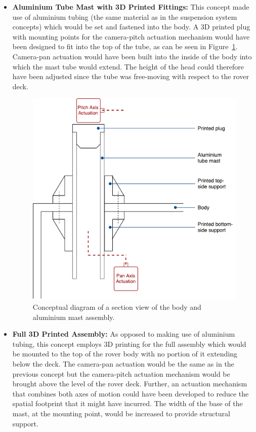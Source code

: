       \begin{itemize}
        \item \textbf{Aluminium Tube Mast with 3D Printed Fittings:} This concept made use of aluminium tubing (the same material as in the suspension system concepts) which would be set and fastened into the body. A 3D printed plug with mounting points for the camera-pitch actuation mechanism would have been designed to fit into the top of the tube, as can be seen in Figure~\ref{fig:concepts-aluMast}. Camera-pan actuation would have been built into the inside of the body into which the mast tube would extend. The height of the head could therefore have been adjusted since the tube was free-moving with respect to the rover deck.
        
        \begin{figure}[H]
          \centering
          \includegraphics[width=0.7\linewidth]{figures/concepts-aluMast}
          \caption[Conceptual diagram of a section view of the body and aluminium mast assembly.]{Conceptual diagram of a section view of the body and aluminium mast assembly.}
          \label{fig:concepts-aluMast}
        \end{figure}
        
        \item \textbf{Full 3D Printed Assembly:} As opposed to making use of aluminium tubing, this concept employs 3D printing for the full assembly which would be mounted to the top of the rover body with no portion of it extending below the deck. The camera-pan actuation would be the same as in the previous concept but the camera-pitch actuation mechanism would be brought above the level of the rover deck. Further, an actuation mechanism that combines both axes of motion could have been developed to reduce the spatial footprint that it might have incurred. The width of the base of the mast, at the mounting point, would be increased to provide structural support.
        

\end{itemize}
